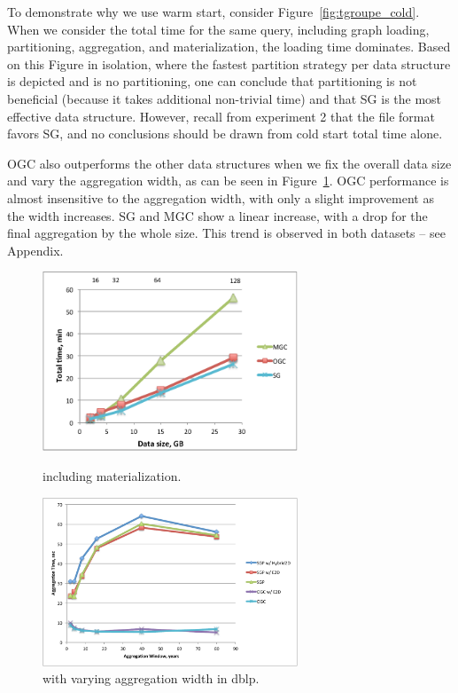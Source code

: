 To demonstrate why we use warm start, consider
Figure~\ref{fig:tgroupe_cold}.  When we consider the total time for
the same query, including graph loading, partitioning, aggregation,
and materialization, the loading time dominates.  Based on this Figure
in isolation, where the fastest partition strategy per data structure
is depicted and is no partitioning, one can conclude that partitioning
is not beneficial (because it takes additional non-trivial time) and
that SG is the most effective data structure.  However, recall from
experiment 2 that the file format favors SG, and no conclusions should
be drawn from cold start total time alone.

OGC also outperforms the other data structures when we fix the overall
data size and vary the aggregation width, as can be seen in
Figure~\ref{fig:tgroupe_width}.  OGC performance is almost insensitive
to the aggregation width, with only a slight improvement as the width
increases.  SG and MGC show a linear increase, with a drop for the
final aggregation by the whole size.  This trend is observed in both
datasets -- see Appendix.

\begin{figure}
\begin{minipage}{3.3in}
  \centering
  \includegraphics[width=3in]{figs/tgroupe_cold.pdf}
  \caption{ including materialization.}
\label{fig:tgroupe_cold}
\end{minipage}
\begin{minipage}{3.3in}
  \centering
  \includegraphics[width=3in]{figs/tgroupe_width.pdf}
  \caption{ with varying aggregation width in dblp.}
  \label{fig:tgroupe_width}
\end{minipage}
\end{figure}

